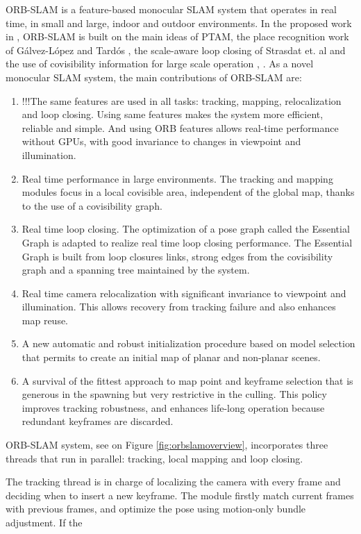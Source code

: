 ORB-SLAM is a feature-based monocular SLAM system that operates in real time, in small and large, indoor and outdoor environments. In the proposed work in \cite{mur2015orb}, ORB-SLAM is built on the main ideas of PTAM, the place recognition work of G\'alvez-L\'opez and Tard\'os \cite{galvez2012bags}, the scale-aware loop closing of Strasdat et. al \cite{strasdat2010scale} and the use of covisibility information for large scale operation \cite{strasdat2011double}, \cite{mei2010closing}. As a novel monocular SLAM system, the main contributions of ORB-SLAM are:
\begin{enumerate}[1.]
	\item {\color{red} !!!}The same features are used in all tasks: tracking, mapping, relocalization and loop closing. Using same features makes the system more efficient, reliable and simple. And using ORB features allows real-time performance without GPUs, with good invariance to changes in viewpoint and illumination.
	\item Real time performance in large environments. The tracking and mapping modules focus in a local covisible area, independent of the global map, thanks to the use of a covisibility graph.
	\item Real time loop closing. The optimization of a pose graph called the Essential Graph is adapted to realize real time loop closing performance. The Essential Graph is built from loop closures links, strong edges from the covisibility graph and a spanning tree maintained by the system.
	\item Real time camera relocalization with significant invariance to viewpoint and illumination. This allows recovery from tracking failure and also enhances map reuse.
	\item A new automatic and robust initialization procedure based on model selection that permits to create an initial map of planar and non-planar scenes.
	\item A survival of the fittest approach to map point and keyframe selection that is generous in the spawning but very restrictive in the culling. This policy improves tracking robustness, and enhances life-long operation because redundant keyframes are discarded.
\end{enumerate}

ORB-SLAM system, see on Figure \ref{fig:orbslamoverview}, incorporates three threads that run in parallel: tracking, local mapping and loop closing. 

The tracking thread is in charge of localizing the camera with every frame and deciding when to insert a new keyframe.	The module firstly match current frames with previous frames, and optimize the pose using motion-only bundle adjustment. If the 

